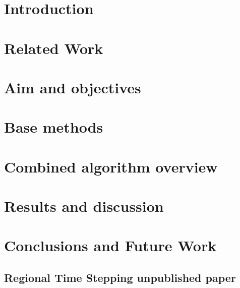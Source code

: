 \documentclass[a4paper,oneside]{bth}
\begin{document}
\cleardoublepage
\pagestyle{headings}

\chapter{Introduction}


\chapter{Related Work}


\chapter{Aim and objectives}


\chapter{Base methods}


\chapter{Combined algorithm overview}


\chapter{Results and discussion}


\chapter{Conclusions and Future Work}



\nocite{*}


\begin{appendices}
\chapter{Regional Time Stepping unpublished paper}

\end{appendices}
\end{document}
